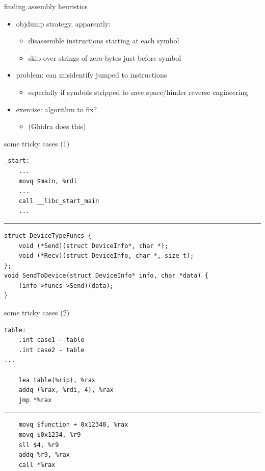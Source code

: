 \begin{frame}{finding assembly heuristics}
    \begin{itemize}
    \item objdump strategy, apparently:
        \begin{itemize}
        \item disassemble instructions starting at each symbol
        \item skip over strings of zero-bytes just before symbol
        \end{itemize}
    \item problem: can misidentify jumped to instructions
        \begin{itemize}
        \item especially if symbols stripped to save space/hinder reverse engineering
        \end{itemize}
    \item exercise: algorithm to fix?
        \begin{itemize}
        \item (Ghidra does this)
        \end{itemize}
    \end{itemize}
\end{frame}

\begin{frame}[fragile]{some tricky cases (1)}
\begin{Verbatim}[fontsize=\fontsize{9}{10}\selectfont]
_start:
    ...
    movq $main, %rdi
    ...
    call __libc_start_main
    ...
\end{Verbatim}
\hrule
\begin{Verbatim}[fontsize=\fontsize{9}{10}\selectfont]
struct DeviceTypeFuncs {
    void (*Send)(struct DeviceInfo*, char *);
    void (*Recv)(struct DeviceInfo, char *, size_t);
};
void SendToDevice(struct DeviceInfo* info, char *data) {
    (info->funcs->Send)(data);
}
\end{Verbatim}
\end{frame}

\begin{frame}[fragile]{some tricky cases (2)}
\begin{Verbatim}
table:
    .int case1 - table
    .int case2 - table
...

    lea table(%rip), %rax
    addq (%rax, %rdi, 4), %rax
    jmp *%rax
\end{Verbatim}
\hrule
\begin{Verbatim}
    movq $function + 0x12340, %rax
    movq $0x1234, %r9
    sll $4, %r9
    addq %r9, %rax
    call *%rax
\end{Verbatim}
\end{frame}

